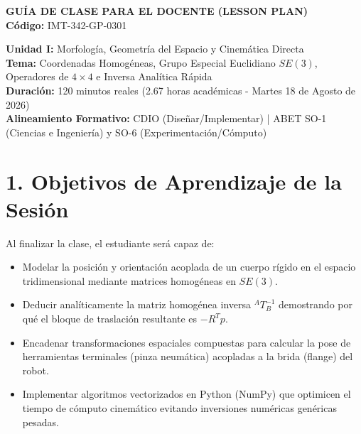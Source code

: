 \documentclass[11pt, a4paper]{article}
\begin{document}
\begin{center}
    \Large\textbf{\textcolor{ucbblue}{GUÍA DE CLASE PARA EL DOCENTE (LESSON PLAN)}}\\
    \vspace{0.2cm}
    \normalsize\textbf{Código:} IMT-342-GP-0301
\end{center}
\vspace{0.3cm}

\noindent\textbf{Unidad I:} Morfología, Geometría del Espacio y Cinemática Directa \\
\textbf{Tema:} Coordenadas Homogéneas, Grupo Especial Euclidiano $SE(3)$, Operadores de $4 \times 4$ e Inversa Analítica Rápida \\
\textbf{Duración:} 120 minutos reales (2.67 horas académicas - Martes 18 de Agosto de 2026) \\
\textbf{Alineamiento Formativo:} CDIO (Diseñar/Implementar) | ABET SO-1 (Ciencias e Ingeniería) y SO-6 (Experimentación/Cómputo)

\section*{1. Objetivos de Aprendizaje de la Sesión}
Al finalizar la clase, el estudiante será capaz de:
\begin{itemize}[label=\textcolor{ucbblue}{$\circ$}]
    \item Modelar la posición y orientación acoplada de un cuerpo rígido en el espacio tridimensional mediante matrices homogéneas en $SE(3)$.
    \item Deducir analíticamente la matriz homogénea inversa $^{A}T_B^{-1}$ demostrando por qué el bloque de traslación resultante es $-R^T p$.
    \item Encadenar transformaciones espaciales compuestas para calcular la pose de herramientas terminales (pinza neumática) acopladas a la brida (flange) del robot.
    \item Implementar algoritmos vectorizados en Python (NumPy) que optimicen el tiempo de cómputo cinemático evitando inversiones numéricas genéricas pesadas.
\end{itemize}
\end{document}
